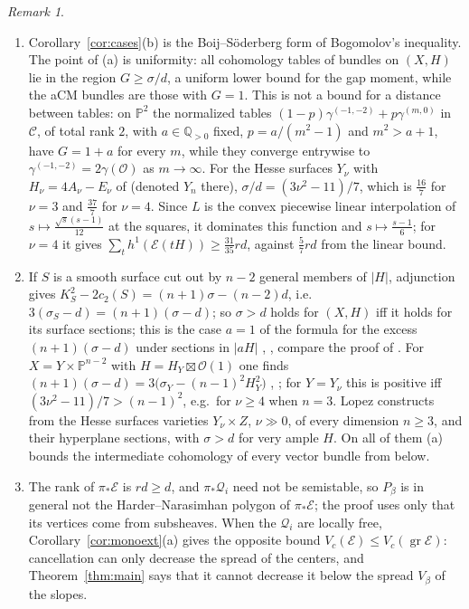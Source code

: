 \documentclass[11pt]{amsart}
\theoremstyle{definition}
\theoremstyle{remark}
\newtheorem{remark}[theorem]{Remark}
\newcommand{\PP}{\mathbb{P}}
\newcommand{\QQ}{\mathbb{Q}}
\newcommand{\OO}{\mathcal{O}}
\newcommand{\cE}{\mathcal{E}}
\newcommand{\cQ}{\mathcal{Q}}
\newcommand{\CC}{\mathcal{C}}
\DeclareMathOperator{\gr}{gr}
\begin{document}
\begin{remark}
\begin{enumerate}[label=(\arabic*)]
\item Corollary~\ref{cor:cases}(b) is the Boij--Söderberg form of Bogomolov's inequality. The point of (a) is uniformity: all cohomology tables of bundles on $(X,H)$ lie in the region $G\ge\sigma/d$, a uniform lower bound for the gap moment, while the aCM bundles are those with $G=1$. This is not a bound for a distance between tables: on $\PP^2$ the normalized tables $(1-p)\gamma^{(-1,-2)}+p\gamma^{(m,0)}$ in $\CC$, of total rank $2$, with $a\in\QQ_{>0}$ fixed, $p=a/(m^2-1)$ and $m^2>a+1$, have $G=1+a$ for every $m$, while they converge entrywise to $\gamma^{(-1,-2)}=2\gamma(\OO)$ as $m\to\infty$. For the Hesse surfaces $Y_\nu$ with $H_\nu=4A_\nu-E_\nu$ of \cite[Cor.~1.4]{An2} (denoted $Y_n$ there), $\sigma/d=(3\nu^2-11)/7$, which is $\frac{16}7$ for $\nu=3$ and $\frac{37}7$ for $\nu=4$. Since $L$ is the convex piecewise linear interpolation of $s\mapsto\frac{\sqrt s(s-1)}{12}$ at the squares, it dominates this function and $s\mapsto\frac{s-1}6$; for $\nu=4$ it gives $\sum_th^1(\cE(tH))\ge\frac{31}{35}rd$, against $\frac57rd$ from the linear bound.
\item If $S$ is a smooth surface cut out by $n-2$ general members of $|H|$, adjunction gives $K_S^2-2c_2(S)=(n+1)\sigma-(n-2)d$, i.e.\ $3(\sigma_S-d)=(n+1)(\sigma-d)$; so $\sigma>d$ holds for $(X,H)$ iff it holds for its surface sections; this is the case $a=1$ of the formula for the excess $(n+1)(\sigma-d)$ under sections in $|aH|$ \cite[Rem.~5.7]{An2}, \cite[Lemma~3.3]{An3}, compare the proof of \cite[Lem.~3.1]{Lo26}. For $X=Y\times\PP^{n-2}$ with $H=H_Y\boxtimes\OO(1)$ one finds $(n+1)(\sigma-d)=3\big(\sigma_Y-(n-1)^2H_Y^2\big)$ \cite[Cor.~5.3]{An2}, \cite[Cor.~10.9]{An3}; for $Y=Y_\nu$ this is positive iff $(3\nu^2-11)/7>(n-1)^2$, e.g.\ for $\nu\ge4$ when $n=3$. Lopez \cite[Thm.~1]{Lo26} constructs from the Hesse surfaces varieties $Y_\nu\times Z$, $\nu\gg0$, of every dimension $n\ge3$, and their hyperplane sections, with $\sigma>d$ for very ample $H$. On all of them (a) bounds the intermediate cohomology of every vector bundle from below.
\item The rank of $\pi_*\cE$ is $rd\ge d$, and $\pi_*\cQ_i$ need not be semistable, so $P_\beta$ is in general not the Harder--Narasimhan polygon of $\pi_*\cE$; the proof uses only that its vertices come from subsheaves. When the $\cQ_i$ are locally free, Corollary~\ref{cor:monoext}(a) gives the opposite bound $V_c(\cE)\le V_c(\gr\cE)$: cancellation can only decrease the spread of the centers, and Theorem~\ref{thm:main} says that it cannot decrease it below the spread $V_\beta$ of the slopes.

\end{enumerate}
\end{remark}
\end{document}
